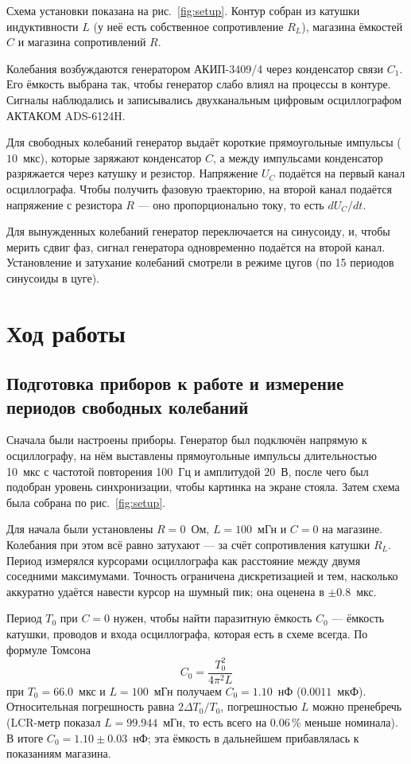 \documentclass[reprint, amsmath, amssymb, aps, pra, nofootinbib]{revtex4-2}
\begin{document}
Схема установки показана на рис.~\ref{fig:setup}. Контур собран из катушки индуктивности $L$ (у неё есть собственное сопротивление $R_L$), магазина ёмкостей $C$ и магазина сопротивлений $R$. 

Колебания возбуждаются генератором АКИП-3409/4 через конденсатор связи $C_1$. Его ёмкость выбрана так, чтобы генератор слабо влиял на процессы в контуре. Сигналы наблюдались и записывались двухканальным цифровым осциллографом АКТАКОМ ADS-6124H.

Для свободных колебаний генератор выдаёт короткие прямоугольные импульсы ($10$~мкс), которые заряжают конденсатор $C$, а между импульсами конденсатор разряжается через катушку и резистор. Напряжение $U_C$ подаётся на первый канал осциллографа. Чтобы получить фазовую траекторию, на второй канал подаётся напряжение с резистора $R$ — оно пропорционально току, то есть $dU_C/dt$. 

Для вынужденных колебаний генератор переключается на синусоиду, и, чтобы мерить сдвиг фаз, сигнал генератора одновременно подаётся на второй канал. Установление и затухание колебаний смотрели в режиме цугов (по 15 периодов синусоиды в цуге).



\section{Ход работы}

\subsection{Подготовка приборов к работе и измерение периодов свободных колебаний}

Сначала были настроены приборы. Генератор был подключён напрямую к осциллографу, на нём выставлены прямоугольные импульсы длительностью 10~мкс с частотой повторения 100~Гц и амплитудой 20~В, после чего был подобран уровень синхронизации, чтобы картинка на экране стояла. Затем схема была собрана по рис.~\ref{fig:setup}.

Для начала были установлены $R = 0$~Ом, $L = 100$~мГн и $C = 0$ на магазине. Колебания при этом всё равно затухают — за счёт сопротивления катушки $R_L$. Период измерялся курсорами осциллографа как расстояние между двумя соседними максимумами. Точность ограничена дискретизацией и тем, насколько аккуратно удаётся навести курсор на шумный пик; она оценена в $\pm 0.8$~мкс.

Период $T_0$ при $C = 0$ нужен, чтобы найти паразитную ёмкость $C_0$ — ёмкость катушки, проводов и входа осциллографа, которая есть в схеме всегда. По формуле Томсона
\begin{equation}
    C_0 = \frac{T_0^2}{4\pi^2 L}
\end{equation}
при $T_0 = 66.0$~мкс и $L = 100$~мГн получаем $C_0 = 1.10$~нФ ($0.0011$~мкФ). Относительная погрешность равна $2 \Delta T_0 / T_0$, погрешностью $L$ можно пренебречь (LCR-метр показал $L = 99.944$~мГн, то есть всего на 0.06\,\% меньше номинала). В итоге $C_0 = 1.10 \pm 0.03$~нФ; эта ёмкость в дальнейшем прибавлялась к показаниям магазина.
\end{document}
